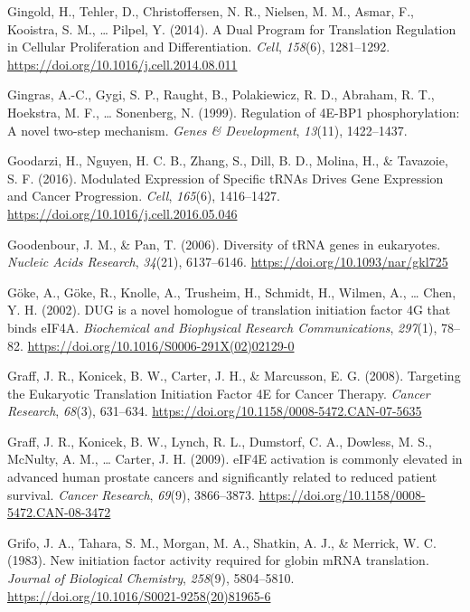 \documentclass[12pt,openany]{book}
\begin{document}
\hypertarget{ref-Gingold2014}{}
Gingold, H., Tehler, D., Christoffersen, N. R., Nielsen, M. M., Asmar,
F., Kooistra, S. M., \ldots{} Pilpel, Y. (2014). A Dual Program for
Translation Regulation in Cellular Proliferation and Differentiation.
\emph{Cell}, \emph{158}(6), 1281--1292.
\url{https://doi.org/10.1016/j.cell.2014.08.011}

\hypertarget{ref-Gingras1999}{}
Gingras, A.-C., Gygi, S. P., Raught, B., Polakiewicz, R. D., Abraham, R.
T., Hoekstra, M. F., \ldots{} Sonenberg, N. (1999). Regulation of 4E-BP1
phosphorylation: A novel two-step mechanism. \emph{Genes \&
Development}, \emph{13}(11), 1422--1437.

\hypertarget{ref-Goodarzi2016}{}
Goodarzi, H., Nguyen, H. C. B., Zhang, S., Dill, B. D., Molina, H., \&
Tavazoie, S. F. (2016). Modulated Expression of Specific tRNAs Drives
Gene Expression and Cancer Progression. \emph{Cell}, \emph{165}(6),
1416--1427. \url{https://doi.org/10.1016/j.cell.2016.05.046}

\hypertarget{ref-Goodenbour2006}{}
Goodenbour, J. M., \& Pan, T. (2006). Diversity of tRNA genes in
eukaryotes. \emph{Nucleic Acids Research}, \emph{34}(21), 6137--6146.
\url{https://doi.org/10.1093/nar/gkl725}

\hypertarget{ref-Goke2002}{}
Göke, A., Göke, R., Knolle, A., Trusheim, H., Schmidt, H., Wilmen, A.,
\ldots{} Chen, Y. H. (2002). DUG is a novel homologue of translation
initiation factor 4G that binds eIF4A. \emph{Biochemical and Biophysical
Research Communications}, \emph{297}(1), 78--82.
\url{https://doi.org/10.1016/S0006-291X(02)02129-0}

\hypertarget{ref-Graff2008}{}
Graff, J. R., Konicek, B. W., Carter, J. H., \& Marcusson, E. G. (2008).
Targeting the Eukaryotic Translation Initiation Factor 4E for Cancer
Therapy. \emph{Cancer Research}, \emph{68}(3), 631--634.
\url{https://doi.org/10.1158/0008-5472.CAN-07-5635}

\hypertarget{ref-Graff2009}{}
Graff, J. R., Konicek, B. W., Lynch, R. L., Dumstorf, C. A., Dowless, M.
S., McNulty, A. M., \ldots{} Carter, J. H. (2009). eIF4E activation is
commonly elevated in advanced human prostate cancers and significantly
related to reduced patient survival. \emph{Cancer Research},
\emph{69}(9), 3866--3873.
\url{https://doi.org/10.1158/0008-5472.CAN-08-3472}

\hypertarget{ref-Grifo1983}{}
Grifo, J. A., Tahara, S. M., Morgan, M. A., Shatkin, A. J., \& Merrick,
W. C. (1983). New initiation factor activity required for globin mRNA
translation. \emph{Journal of Biological Chemistry}, \emph{258}(9),
5804--5810. \url{https://doi.org/10.1016/S0021-9258(20)81965-6}
\end{document}
